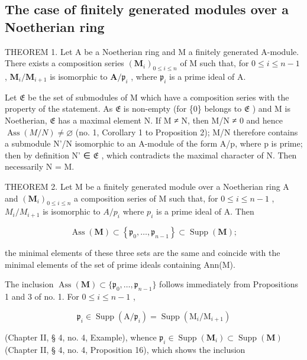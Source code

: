 \subsection{The case of finitely generated modules over a Noetherian ring}

THEOREM 1. Let A be a Noetherian ring and M a finitely generated A-module. There exists a composition series \((\mathbf{M}_i)_{0\leqslant i\leqslant n}\) of M such that, for \(0\leqslant i\leqslant n - 1\) , \(\mathbf{M}_i / \mathbf{M}_{i + 1}\) is isomorphic to \(\mathbf{A} / \mathfrak{p}_i\) , where \(\mathfrak{p}_i\) is a prime ideal of A.

Let \(\mathfrak{E}\) be the set of submodules of M which have a composition series with the property of the statement. As \(\mathfrak{E}\) is non-empty (for \{0\} belongs to \(\mathfrak{E}\) ) and M is Noetherian, \(\mathfrak{E}\) has a maximal element N. If M ≠ N, then M/N ≠ 0 and hence \(\operatorname{Ass}(M/N) \neq \varnothing\) (no. 1, Corollary 1 to Proposition 2); M/N therefore contains a submodule N'/N isomorphic to an A-module of the form A/p, where p is prime; then by definition N' ∈ \(\mathfrak{E}\) , which contradicts the maximal character of N. Then necessarily N = M.

THEOREM 2. Let M be a finitely generated module over a Noetherian ring A and \((\mathbf{M}_{i})_{0\leqslant i\leqslant n}\) a composition series of M such that, for \(0\leqslant i\leqslant n-1\) , \(M_{i}/M_{i+1}\) is isomorphic to \(A/p_{i}\) where \(p_{i}\) is a prime ideal of A. Then

\[
\operatorname{Ass} (\mathbf {M}) \subset \left\{\mathfrak {p} _ {0}, \dots , \mathfrak {p} _ {n - 1} \right\} \subset \operatorname{Supp} (\mathbf {M});\tag{4}
\]

the minimal elements of these three sets are the same and coincide with the minimal elements of the set of prime ideals containing Ann(M).

The inclusion \(\operatorname{Ass}(\mathbf{M}) \subset \{\mathfrak{p}_0, \ldots, \mathfrak{p}_{n-1}\}\) follows immediately from Propositions 1 and 3 of no. 1. For \(0 \leqslant i \leqslant n - 1\) ,

\[
\mathfrak {p} _ {i} \in \operatorname{Supp} (\mathrm{A} / \mathfrak {p} _ {i}) = \operatorname{Supp} (\mathrm{M} _ {i} / \mathrm{M} _ {i + 1})
\]

(Chapter II, § 4, no. 4, Example), whence \(\mathfrak{p}_i \in \operatorname{Supp}(\mathbf{M}_i) \subset \operatorname{Supp}(\mathbf{M})\) (Chapter II, § 4, no. 4, Proposition 16), which shows the inclusion

